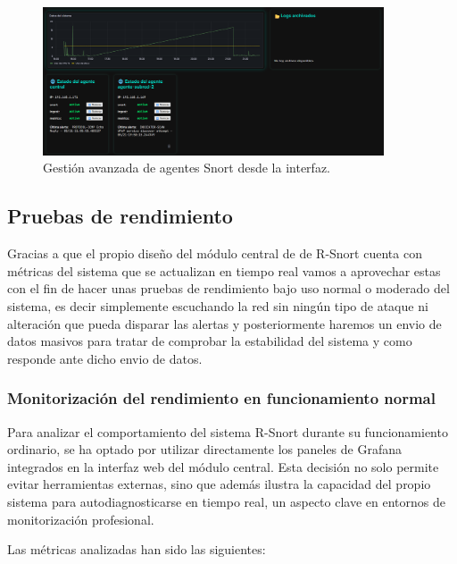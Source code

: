 \documentclass[11pt,a4paper,twoside]{report}
\begin{document}
\begin{figure}[H]
	\centering
	\includegraphics[width=0.9\textwidth]{configuracion/10.png}
	\caption{Gestión avanzada de agentes Snort desde la interfaz.}
	\label{fig:estado-multiple-agentes}
\end{figure}

\subsection{Pruebas de rendimiento}

Gracias a que el propio diseño del módulo central de de R-Snort cuenta con métricas del sistema que se actualizan en tiempo real vamos a aprovechar estas con el fin de hacer unas pruebas de rendimiento bajo uso normal o moderado del sistema, es decir simplemente escuchando la red sin ningún tipo de ataque ni alteración que pueda disparar las alertas y posteriormente haremos un envio de datos masivos para tratar de comprobar la estabilidad del sistema y como responde ante dicho envio de datos.

\subsubsection{Monitorización del rendimiento en funcionamiento normal}

Para analizar el comportamiento del sistema R-Snort durante su funcionamiento ordinario, se ha optado por utilizar directamente los paneles de Grafana integrados en la interfaz web del módulo central. Esta decisión no solo permite evitar herramientas externas, sino que además ilustra la capacidad del propio sistema para autodiagnosticarse en tiempo real, un aspecto clave en entornos de monitorización profesional.

Las métricas analizadas han sido las siguientes:
\end{document}
